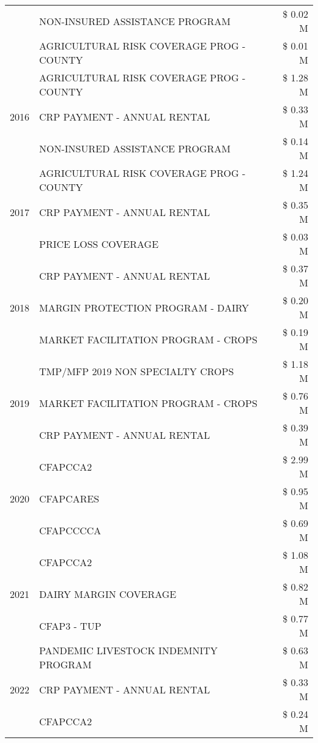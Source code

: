 \begin{tabular}{llr}
 & NON-INSURED ASSISTANCE PROGRAM & \$ 0.02 M \\
 & AGRICULTURAL RISK COVERAGE PROG - COUNTY & \$ 0.01 M \\
\cline{1-3}
\multirow[t]{3}{*}{2016} & AGRICULTURAL RISK COVERAGE PROG - COUNTY & \$ 1.28 M \\
 & CRP PAYMENT - ANNUAL RENTAL & \$ 0.33 M \\
 & NON-INSURED ASSISTANCE PROGRAM & \$ 0.14 M \\
\cline{1-3}
\multirow[t]{3}{*}{2017} & AGRICULTURAL RISK COVERAGE PROG - COUNTY & \$ 1.24 M \\
 & CRP PAYMENT - ANNUAL RENTAL & \$ 0.35 M \\
 & PRICE LOSS COVERAGE & \$ 0.03 M \\
\cline{1-3}
\multirow[t]{3}{*}{2018} & CRP PAYMENT - ANNUAL RENTAL & \$ 0.37 M \\
 & MARGIN PROTECTION PROGRAM - DAIRY & \$ 0.20 M \\
 & MARKET FACILITATION PROGRAM - CROPS & \$ 0.19 M \\
\cline{1-3}
\multirow[t]{3}{*}{2019} & TMP/MFP 2019 NON SPECIALTY CROPS & \$ 1.18 M \\
 & MARKET FACILITATION PROGRAM - CROPS & \$ 0.76 M \\
 & CRP PAYMENT - ANNUAL RENTAL & \$ 0.39 M \\
\cline{1-3}
\multirow[t]{3}{*}{2020} & CFAPCCA2 & \$ 2.99 M \\
 & CFAPCARES & \$ 0.95 M \\
 & CFAPCCCCA & \$ 0.69 M \\
\cline{1-3}
\multirow[t]{3}{*}{2021} & CFAPCCA2 & \$ 1.08 M \\
 & DAIRY MARGIN COVERAGE & \$ 0.82 M \\
 & CFAP3 - TUP & \$ 0.77 M \\
\cline{1-3}
\multirow[t]{3}{*}{2022} & PANDEMIC LIVESTOCK INDEMNITY PROGRAM & \$ 0.63 M \\
 & CRP PAYMENT - ANNUAL RENTAL & \$ 0.33 M \\
 & CFAPCCA2 & \$ 0.24 M \\
\cline{1-3}
\bottomrule
\end{tabular}
